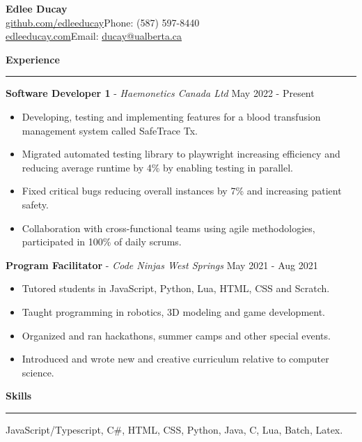 \documentclass{article}
\begin{document}
	
	\noindent \large \textbf{Edlee Ducay\\}
	\normalsize \small \href{https://github.com/EdleeDucay}{github.com/edleeducay}\hfill Phone: (587) 597-8440 \\
	\normalsize \small \href{https://edleeducay.com/}{edleeducay.com}\hfill Email: \href{mailto:ducay@ualberta.ca}{ducay@ualberta.ca}

\vspace{1mm}
\noindent\textbf{Experience}
\vspace{1mm}
\hrule
\vspace{1mm}
\hfill\break
\noindent  \textbf{Software Developer 1} - \textit{Haemonetics Canada Ltd} \hfill May 2022 - Present
\begin{itemize}[noitemsep, nolistsep]
	\item {Developing, testing and implementing features for a blood transfusion management system called SafeTrace Tx.}
	\item {Migrated automated testing library to playwright increasing efficiency and reducing average runtime by 4\% by enabling testing in parallel.}
	\item {Fixed critical bugs reducing overall instances by 7\% and increasing patient safety.}
	\item {Collaboration with cross-functional teams using agile methodologies, participated in 100\% of daily scrums.}
\end{itemize}
\vspace{1mm}
\noindent  \textbf{Program Facilitator} - \textit{Code Ninjas West Springs} \hfill May 2021 - Aug 2021
\begin{itemize}[noitemsep, nolistsep]
	\item {Tutored students in JavaScript, Python, Lua, HTML, CSS and Scratch.}
	\item {Taught programming in robotics, 3D modeling and game development.}
	\item {Organized and ran hackathons, summer camps and other special events.}
	\item {Introduced and wrote new and creative curriculum relative to computer science.}
\end{itemize}
\vspace{2mm}
\noindent \textbf{Skills}
\vspace{1mm}
\hrule
\vspace{1mm}
\hfill\break
	 JavaScript/Typescript, C\#, HTML, CSS, Python, Java, C, Lua, Batch, Latex. \\
\end{document}
